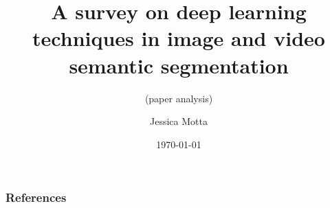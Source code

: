 \documentclass[aspectratio=169]{beamer} %
\title[DP in semantic segmentation]{A survey on deep learning techniques in image and video semantic segmentation}
\subtitle{(paper analysis)}
\date{\today}
\author[Jessica Motta]{Jessica Motta}
\institute[SENAI CIMATEC]{SENAI CIMATEC}
\begin{document}
\begin{frame}
  \titlepage
\end{frame}










    
    \begin{frame}[t, allowframebreaks]
        \frametitle{References}
        
        
    \end{frame}
\end{document}
